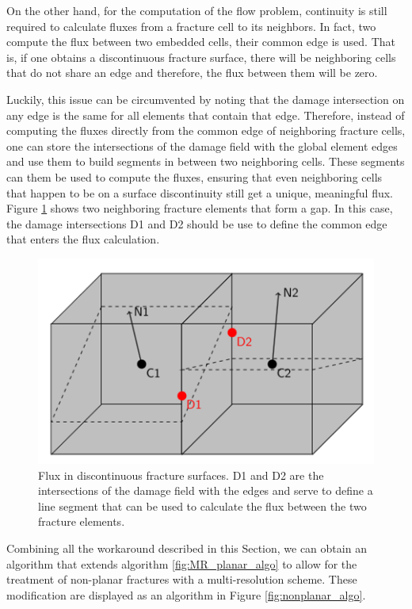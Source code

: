 On the other hand, for the computation of the flow problem, continuity is still required to calculate fluxes from a fracture cell to its neighbors. In fact, two compute the flux between two embedded cells, their common edge is used. That is, if one obtains a discontinuous fracture surface, there will be neighboring cells that do not share an edge and therefore, the flux between them will be zero.

Luckily, this issue can be circumvented by noting that the damage intersection on any edge is the same for all elements that contain that edge. Therefore, instead of computing the fluxes directly from the common edge of neighboring fracture cells, one can store the intersections of the damage field with the global element edges and use them to build segments in between two neighboring cells. These segments can them be used to compute the fluxes, ensuring that even neighboring cells that happen to be on a surface discontinuity still get a unique, meaningful flux. Figure \ref{fig:flux_calculations} shows two neighboring fracture elements that form a gap. In this case, the damage intersections D1 and D2 should be use to define the common edge that enters the flux calculation.

\begin{figure}[h]
    \centering
    \includegraphics[width=0.6\linewidth]{Chapter4/figures/nonplanar/nonplanar_flux.png}
    \caption{Flux in discontinuous fracture surfaces. D1 and D2 are the intersections of the damage field with the edges and serve to define a line segment that can be used to calculate the flux between the two fracture elements.}
    \label{fig:flux_calculations}
\end{figure}

Combining all the workaround described in this Section, we can obtain an algorithm that extends algorithm \ref{fig:MR_planar_algo} to allow for the treatment of non-planar fractures with a multi-resolution scheme. These modification are displayed as an algorithm in Figure \ref{fig:nonplanar_algo}.

